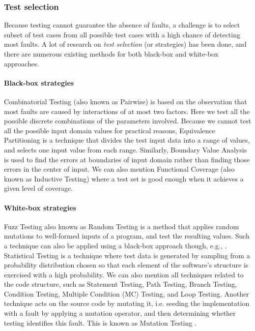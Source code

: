 \subsubsection{Test selection}

Because testing cannot guarantee the absence of faults, a
challenge is to select subset of test cases from all possible
test cases with a high chance of detecting most faults. A lot of
research on \textit{test selection} (or strategies) has been
done, and there are numerous existing methods for both black-box
and white-box approaches.

\paragraph{Black-box strategies} Combinatorial Testing (also
known as Pairwise) \cite{Tai98atest} is based on the observation
that most faults are caused by interactions of at most two
factors. Here we test all the possible discrete combinations of
the parameters involved.  Because we cannot test all the possible
input domain values for practical reasons, Equivalence
Partitioning \cite{Huang13} is a technique that divides the test
input data into a range of values, and selects one input value
from each range. Similarly, Boundary Value Analysis
\cite{Ramachandran:2003:TSC:942796.943301} is used to find the
errors at boundaries of input domain rather than finding those
errors in the center of input. We can also mention Functional
Coverage (also known as Inductive Testing)
\cite{Walkinshaw:2010:IFC:1928028.1928038} where a test set is
good enough when it achieves a given level of coverage.

\paragraph{White-box strategies} Fuzz Testing also known as
Random Testing
\cite{Duran:1981:RRT:800078.802530,Godefroid08automatedwhitebox}
is a method that applies random mutations to well-formed inputs
of a program, and test the resulting values. Such a technique can
also be applied using a black-box approach though, e.g.,
\cite{5387827}.  Statistical Testing
\cite{Walton:1995:STS:210453.210458} is a technique where test
data is generated by sampling from a probability distribution
chosen so that each element of the software's structure is
exercised with a high probability. We can also mention all
techniques related to the code structure, such as Statement
Testing, Path Testing, Branch Testing, Condition Testing,
Multiple Condition (MC) Testing, and Loop Testing.  Another
technique acts on the source code by mutating it, i.e.  seeding
the implementation with a fault by applying a mutation operator,
and then determining whether testing identifies this fault. This
is known as Mutation Testing \cite{1702444}.

